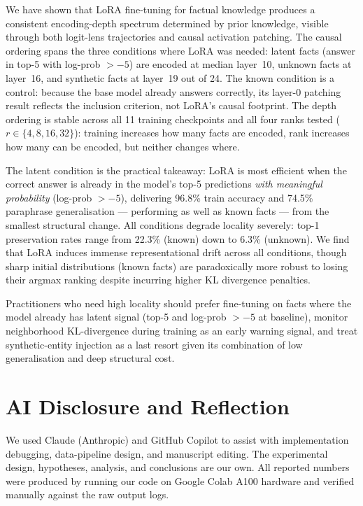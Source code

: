 \documentclass[11pt]{article}
\begin{document}
We have shown that LoRA fine-tuning for factual knowledge produces a consistent
encoding-depth spectrum determined by prior knowledge, visible through both
logit-lens trajectories and causal activation patching.
The causal ordering spans the three conditions where LoRA was needed: latent
facts (answer in top-5 with log-prob $> -5$) are encoded at median layer~10,
unknown facts at layer~16, and synthetic facts at layer~19 out of 24.
The known condition is a control: because the base model already answers
correctly, its layer-0 patching result reflects the inclusion criterion, not
LoRA's causal footprint.
The depth ordering is stable across all 11 training checkpoints and all four
ranks tested ($r \in \{4,8,16,32\}$): training increases how many facts are
encoded, rank increases how many can be encoded, but neither changes where.

The latent condition is the practical takeaway: LoRA is most efficient when
the correct answer is already in the model's top-5 predictions \emph{with
meaningful probability} (log-prob $> -5$), delivering 96.8\% train accuracy
and 74.5\% paraphrase generalisation --- performing as well as known facts ---
from the smallest structural change.
All conditions degrade locality severely: top-1 preservation rates range from
22.3\% (known) down to 6.3\% (unknown). We find that LoRA induces immense representational drift across all conditions, though sharp initial distributions (known facts) are paradoxically more robust to losing their argmax ranking despite incurring higher KL divergence penalties.

Practitioners who need high locality should prefer fine-tuning on facts where
the model already has latent signal (top-5 and log-prob $> -5$ at baseline),
monitor neighborhood KL-divergence during training as an early warning signal,
and treat synthetic-entity injection as a last resort given its combination of
low generalisation and deep structural cost.

\section*{AI Disclosure and Reflection}

We used Claude (Anthropic) and GitHub Copilot to assist with implementation
debugging, data-pipeline design, and manuscript editing.
The experimental design, hypotheses, analysis, and conclusions are our own.
All reported numbers were produced by running our code on Google Colab A100
hardware and verified manually against the raw output logs.



\end{document}
